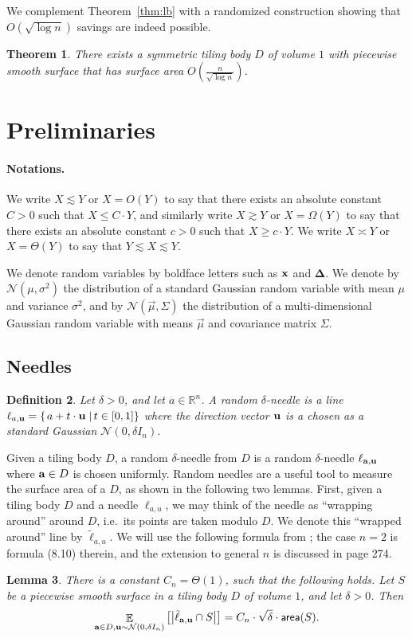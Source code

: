 \documentclass[10pt,a4paper]{article}
\newtheorem{thm}{Theorem}
\newtheorem{lemma}[thm]{Lemma}
\newtheorem{definition}[thm]{Definition}
\newcommand\card[1]{\left| {#1} \right|}
\newcommand\sett[2]{\left\{ \left. #1 \;\right\vert #2 \right\}}
\newcommand\Expect[2]{{\mathop{\mathbb{E}}_{#1}\left[ {#2} \right]}}
\renewcommand\geq{\geqslant}
\renewcommand\leq{\leqslant}
\newcommand{\De}{\Delta}
\def\gg{\gtrsim}
\def\ll{\lesssim}
\def\ee{\asymp}
\begin{document}
We complement Theorem~\ref{thm:lb} with a randomized construction showing that $O(\sqrt{\log n})$ savings
are indeed possible.
\begin{thm}\label{thm:ub}
	There exists a symmetric tiling body $D$ of volume $1$
	with piecewise smooth surface that has surface area $O\left(\frac{n}{\sqrt{\log n}}\right)$.
\end{thm}

\setcounter{thm}{8}\section{Preliminaries}\label{sec:prelim}
\paragraph{Notations.}
We write $X\ll Y$ or $X = O(Y)$ to say that
there exists an absolute constant $C >0$ such that $X\leq C\cdot Y$,
and similarly write $X\gg Y$ or $X = \Omega(Y)$ to say that
there exists an absolute constant $c >0$ such that $X\geq c\cdot Y$.
We write $X\ee Y$ or $X = \Theta(Y)$ to say that $Y\ll X\ll Y$.


We denote random variables by boldface letters such as ${\bf x}$ and $\bm{\De}$.
We denote by $\mathcal{N}(\mu,\sigma^2)$ the distribution of a standard
Gaussian random variable with mean $\mu$ and variance $\sigma^2$, and by
$\mathcal{N}(\vec{\mu}, \Sigma)$ the distribution of a multi-dimensional
Gaussian random variable with means $\vec{\mu}$ and covariance matrix $\Sigma$.
\subsection{Needles}

\begin{definition}
  Let $\delta>0$, and let $a\in\mathbb{R}^n$. A random $\delta$-needle is a line $\ell_{a,{\bf u}} = \sett{a+t\cdot {\bf u}}{t\in[0,1]}$
  where the direction vector ${\bf u}$ is a chosen as a standard Gaussian $\mathcal{N}(0,\delta I_n)$.
\end{definition}

Given a tiling body $D$, a random $\delta$-needle from $D$ is a random $\delta$-needle $\ell_{{\bf a}, {\bf u}}$
where ${\bf a}\in D$ is chosen uniformly. Random needles are a useful tool to measure the surface area of a $D$, as shown
in the following two lemmas. First, given a tiling body $D$ and a needle $\ell_{a, u}$, we may think of the needle
as ``wrapping around'' around $D$,  i.e.\ its points are taken modulo $D$. We denote this ``wrapped around'' line by
$\tilde{\ell}_{a, u}$. We will use the following formula from \cite{Santalo}; the case $n=2$ is formula (8.10) therein,
and the extension to general $n$ is discussed in page 274.
\begin{lemma}\label{lem:santalo}
  There is a constant $C_n = \Theta(1)$, such that the following holds.
  Let $S$ be a piecewise smooth surface in a tiling body $D$ of volume $1$, and let $\delta>0$.
  Then
  \[
   \Expect{{\bf a}\in D, {\bf u}\sim\mathcal{N}(0,\delta I_n)}{\card{\tilde{\ell}_{{\bf a}, {\bf u}}\cap S}} = C_n \cdot\sqrt{\delta} \cdot {\sf area}(S).
  \]
\end{lemma}
\end{document}
